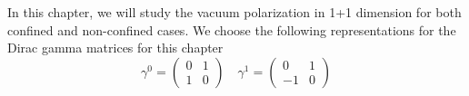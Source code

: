 In this chapter, we will study the vacuum polarization in 1+1 dimension for both confined and non-confined cases.
We choose the following representations for the Dirac gamma matrices for this chapter
\begin{equation*}
\gamma^0 = \begin{pmatrix}
0 & 1 \\
1 & 0 \end{pmatrix}  \quad  \gamma^1 = \begin{pmatrix}
0  & 1 \\
-1 & 0
\end{pmatrix}
\end{equation*}
%
